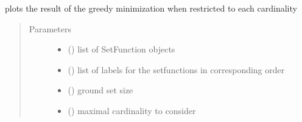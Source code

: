 \documentclass[letterpaper,10pt,english]{sphinxmanual}
\begin{document}
\begin{fulllineitems}
\label{\detokenize{setFTs:setFTs.plotting.plot_min_greedy}}
\sphinxAtStartPar
plots the result of the greedy minimization when restricted to each cardinality
\begin{quote}\begin{description}
\item[{Parameters}] \leavevmode\begin{itemize}
\item {} 
\sphinxAtStartPar
{} (\sphinxstyleliteralemphasis{\sphinxupquote{{[}}}\sphinxstyleliteralemphasis{\sphinxupquote{{]}}}) \textendash{} list of SetFunction objects

\item {} 
\sphinxAtStartPar
{} (\sphinxstyleliteralemphasis{\sphinxupquote{{[}}}\sphinxstyleliteralemphasis{\sphinxupquote{{]}}}) \textendash{} list of labels for the setfunctions in corresponding order

\item {} 
\sphinxAtStartPar
{} () \textendash{} ground set size

\item {} 
\sphinxAtStartPar
{} () \textendash{} maximal cardinality to consider

\end{itemize}

\end{description}\end{quote}

\end{fulllineitems}

\end{document}
